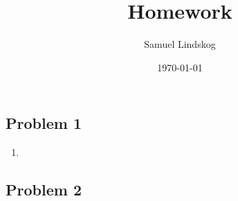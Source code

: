 \documentclass{article}
\title{Homework}
\author{Samuel Lindskog}
\date\today
\begin{document}
\maketitle %

\subsection*{Problem 1}
\begin{enumerate}[label=(\alph*)]
	\item
\end{enumerate}

\subsection*{Problem 2}
\end{document}

